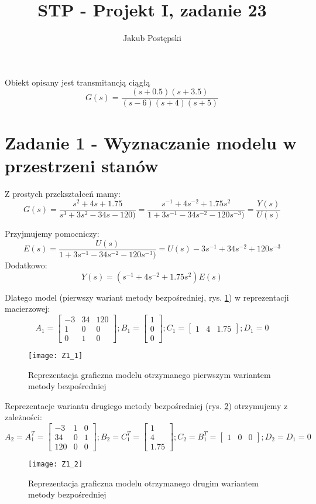 \documentclass{article}
\author{Jakub Postępski}
\title{STP - Projekt I, zadanie 23}
\begin{document}
\maketitle

Obiekt opisany jest transmitancją ciągłą
\[ G(s) = \frac{(s+0.5)(s+3.5)}{(s-6)(s+4)(s+5)} \]
\section{Zadanie 1 - Wyznaczanie modelu w przestrzeni stanów}
Z prostych przekształceń mamy:
\[ G(s) = \frac{s^2 + 4s + 1.75}{s^3 + 3s^2 -34s -120)} = \frac{s^{-1} + 4s^{-2} + 1.75s^{2}}{1 + 3s^{-1} -34s^{-2} -120s^{-3})} = \frac{Y(s)}{U(s)}\]

Przyjmujemy pomocniczy:
\[E(s) = \frac{U(s)}{1 + 3s^{-1} -34s^{-2} -120s^{-3})} = U(s) - 3s^{-1}+34s^{-2} + 120s^{-3}\]
Dodatkowo:
\[Y(s) = (s^{-1} + 4s^{-2} + 1.75s^{2})E(s)\]

Dlatego model (pierwszy wariant metody bezpośredniej, rys. \ref{fig:z11}) w reprezentacji macierzowej:
\[A_1 = \begin{bmatrix} -3 & 34 & 120\\ 1 & 0 & 0\\ 0 & 1 & 0 \end{bmatrix};
B_1 = \begin{bmatrix} 1\\ 0\\ 0 \end{bmatrix};
C_1 = \begin{bmatrix} 1 & 4 & 1.75 \end{bmatrix};
D_1 = 0
\]
\begin{figure}
\centering
\texttt{[image: Z1\_1]}
\caption{Reprezentacja graficzna modelu otrzymanego pierwszym wariantem metody bezpośredniej}
\label{fig:z11}
\end{figure}

Reprezentacje wariantu drugiego metody bezpośredniej (rys. \ref{fig:z12}) otrzymujemy z zależności:
\[A_2 = A_1^T = \begin{bmatrix} -3 & 1 & 0\\ 34 & 0 & 1\\ 120 & 0 & 0 \end{bmatrix};
B_2 = C_1^T = \begin{bmatrix}  1\\ 4\\ 1.75 \end{bmatrix};
C_2 = B_1^T = \begin{bmatrix} 1 & 0 & 0 \end{bmatrix};
D_2 = D_1 = 0
\]
\begin{figure}
\centering
\texttt{[image: Z1\_2]}
\caption{Reprezentacja graficzna modelu otrzymanego drugim wariantem metody bezpośredniej}
\label{fig:z12}
\end{figure}
\end{document}
